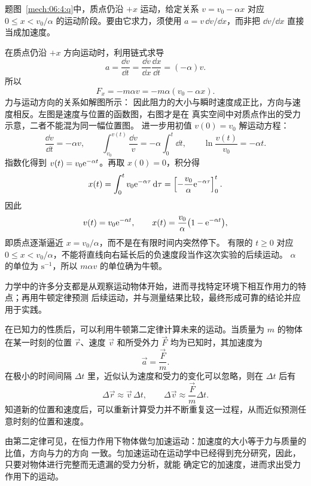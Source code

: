 {\begin{xesolution}题图~\ref{mech:06:4:q}中，质点仍沿 $+x$ 运动，给定关系 $v=v_0-\alpha x$ 对应 $0\le x<v_0/\alpha$ 的运动阶段。要由它求力，须使用 $a=v\,\dd v/\dd x$，而非把 $\dd v/\dd x$ 直接当成加速度。

在质点仍沿 $+x$ 方向运动时，利用链式求导
\[
  a=\frac{\dd v}{\dd t}
  =\frac{\dd v}{\dd x}\frac{\dd x}{\dd t}
  =(-\alpha)v.
\]
所以
\[
  \boxed{F_x=-m\alpha v=-m\alpha(v_0-\alpha x)}.
\]
力与运动方向的关系如解图所示：
\soldiagTwoFour
因此阻力的大小与瞬时速度成正比，方向与速度相反。左图是速度与位置的函数图，右图才是在
真实空间中对质点作出的受力示意，二者不能混为同一幅位置图。
进一步用初值 $v(0)=v_0$ 解运动方程：
\[
 \frac{\dd v}{\dd t}=-\alpha v,
 \qquad\int_{v_0}^{v(t)}\frac{\dd v}{v}=-\alpha\int_0^t\dd t,
 \qquad\ln\frac{v(t)}{v_0}=-\alpha t.
\]
指数化得到 $v(t)=v_0\mathrm e^{-\alpha t}$。再取 $x(0)=0$，积分得
\[
 x(t)=\int_0^t v_0\mathrm e^{-\alpha\tau}\mathop{}\!\mathrm d\tau
 =\left[-\frac{v_0}{\alpha}\mathrm e^{-\alpha\tau}\right]_0^t.
\]
因此
\[
  v(t)=v_0\mathrm e^{-\alpha t},
  \qquad
  x(t)=\frac{v_0}{\alpha}\bigl(1-\mathrm e^{-\alpha t}\bigr),
\]
即质点逐渐逼近 $x=v_0/\alpha$，而不是在有限时间内突然停下。
有限的 $t\ge0$ 对应 $0\le x<v_0/\alpha$，不能将直线向右延长后的负速度段当作这次实验的后续运动。
$\alpha$ 的单位为 $\mathrm{s^{-1}}$，所以 $m\alpha v$ 的单位确为牛顿。
\end{xesolution}

力学中的许多分支都是从观察运动物体开始，进而寻找特定环境下相互作用力的特点；再用牛顿定律预测
后续运动，并与测量结果比较，最终形成可靠的结论并应用于实践。

在已知力的性质后，可以利用牛顿第二定律计算未来的运动。当质量为 $m$ 的物体在某一时刻的位置
$\vec r$、速度 $\vec v$ 和所受外力 $\vec F$ 均为已知时，其加速度为
\begin{equation}
  \vec a=\frac{\vec F}{m}.
\end{equation}
在极小的时间间隔 $\Delta t$ 里，近似认为速度和受力的变化可以忽略，则在 $\Delta t$ 后有
\begin{equation}
  \Delta\vec r\approx\vec v\,\Delta t,
  \qquad
  \Delta\vec v\approx\frac{\vec F}{m}\Delta t.
\end{equation}
知道新的位置和速度后，可以重新计算受力并不断重复这一过程，从而近似预测任意时刻的位置和速度。

由第二定律可见，在恒力作用下物体做匀加速运动：加速度的大小等于力与质量的比值，方向与力的方向
一致。匀加速运动在运动学中已经得到充分研究，因此，只要对物体进行完整而无遗漏的受力分析，就能
确定它的加速度，进而求出受力作用下的运动。

}
